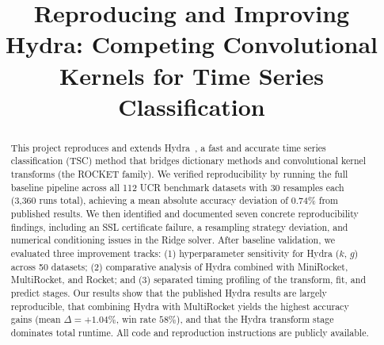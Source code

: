 \documentclass[conference]{IEEEtran}
\begin{document}
\title{Reproducing and Improving Hydra: Competing Convolutional\\
Kernels for Time Series Classification}

\author{
\and
{}
\and
{}
}
\maketitle

\begin{abstract}
This project reproduces and extends Hydra~\cite{hydra2023}, a fast and
accurate time series classification (TSC) method that bridges dictionary
methods and convolutional kernel transforms (the ROCKET family). We
verified reproducibility by running the full baseline pipeline across all
112 UCR benchmark datasets with 30 resamples each (3,360 runs total),
achieving a mean absolute accuracy deviation of 0.74\% from published
results. We then identified and documented seven concrete reproducibility
findings, including an SSL certificate failure, a resampling strategy
deviation, and numerical conditioning issues in the Ridge solver. After
baseline validation, we evaluated three improvement tracks: (1)
hyperparameter sensitivity for Hydra ($k$, $g$) across 50 datasets;
(2) comparative analysis of Hydra combined with MiniRocket, MultiRocket,
and Rocket; and (3) separated timing profiling of the transform, fit,
and predict stages. Our results show that the published Hydra results are
largely reproducible, that combining Hydra with MultiRocket yields the
highest accuracy gains (mean $\Delta = +1.04\%$, win rate $58\%$), and
that the Hydra transform stage dominates total runtime. All code and
reproduction instructions are publicly available.
\end{abstract}
\end{document}
